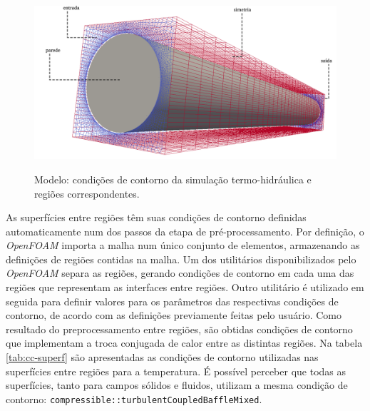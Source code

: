 \begin{figure}[htb]
  \caption{Modelo: condições de contorno da simulação termo-hidráulica e regiões
    correspondentes.}
  \centering\includegraphics[scale=0.5]{figuras/inlet_paredes_extremos_wireframe_portugues.png}
  \label{fig:ccth}
\end{figure}

As superfícies entre regiões têm suas condições de contorno definidas automaticamente
num dos passos da etapa de pré-processamento. Por definição, o \textit{OpenFOAM} importa
a malha num único conjunto de elementos, armazenando as definições de regiões
contidas na malha. Um dos utilitários disponibilizados pelo \textit{OpenFOAM} separa
as regiões, gerando condições de contorno em cada uma das regiões que representam
as interfaces entre regiões. Outro utilitário é utilizado em seguida para definir valores
para os parâmetros das respectivas condições de contorno, de acordo com as definições
previamente feitas pelo usuário. Como resultado do preprocessamento
entre regiões, são obtidas condições de contorno que implementam a troca
conjugada de calor entre as distintas regiões. Na tabela \ref{tab:cc-superf} são
apresentadas as condições de contorno utilizadas nas superfícies entre regiões para a temperatura.
É possível perceber que todas as superfícies,
tanto para campos sólidos e fluidos, utilizam a mesma condição de contorno:
\texttt{compressible::turbulentCoupledBaffleMixed}.


